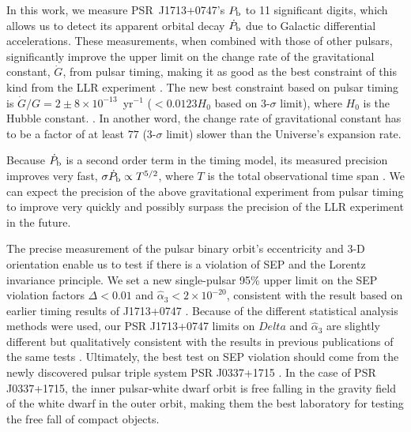 In this work, we measure PSR~J1713+0747's $P_{\rm b}$ to 11 significant
digits, which allows us to detect its apparent orbital decay $\dot{P}_{\rm b}$ due to Galactic differential accelerations.
These measurements, when combined with those of other pulsars, 
significantly improve the upper limit on the change rate of the gravitational
 constant, $\dot{G}$, from pulsar timing, making it as good as the best
constraint of this kind from the LLR experiment \citep{hmb10}.
The new best constraint based on pulsar timing is $\dot{G}/G
=2\pm8\times10^{-13}$~yr$^{-1}$ ($<0.0123H_0$ based on 3-$\sigma$ limit), where $H_0$ is the Hubble constant. . 
In another word, the change rate of gravitational constant has to be a factor
of at least $77$ (3-$\sigma$ limit) slower than the Universe's expansion rate.

Because $\dot P_{\rm b}$ is a second order term in the timing 
model, its measured precision improves very fast, $\sigma \dot
P_{\rm b} \propto T^{5/2}$, where $T$ is the total observational time
span \cite{dt92}.
We can expect the precision of the above gravitational experiment from pulsar
timing to improve very quickly and possibly surpass the precision
of the LLR
experiment in the future.

The precise measurement of the pulsar binary orbit's eccentricity and
3-D orientation enable us to test if there is a violation of SEP and the
Lorentz invariance principle. We set a new single-pulsar 95\% upper limit on the SEP violation
factors $\Delta <0.01$ and $\hat{\alpha}_3<2\times10^{-20}$, consistent with
the result \citep{gsf+11} based on earlier timing results of J1713+0747 
\citep{sns+05}.
Because of the different statistical analysis methods were used, our PSR J1713+0747 limits on $Delta$ and $\hat{\alpha}_3$ are slightly
different but qualitatively consistent with the results in previous publications of the same tests  \citep{wex00, sns+05, sfl+05, gsf+11}.
Ultimately, the best test on SEP violation should come from the newly
discovered pulsar triple system PSR J0337+1715 \citep{rsa+14}. In the case of
PSR J0337+1715, the
inner pulsar-white dwarf orbit is free falling in the gravity field of the
white dwarf in the outer orbit, making them the best laboratory for testing
the free fall of compact objects.



